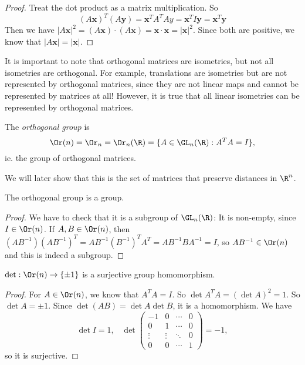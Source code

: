 \documentclass[a4paper]{article}
\begin{document}
\begin{proof}
  Treat the dot product as a matrix multiplication. So
  \[
    (A\mathbf{x})^T(A\mathbf{y}) = \mathbf{x}^{T}A^TAy = \mathbf{x}^TI\mathbf{y} = \mathbf{x}^T\mathbf{y}
  \]
  Then we have $|A\mathbf{x}|^2 = (A\mathbf{x})\cdot (A\mathbf{x}) = \mathbf{x}\cdot \mathbf{x} = |\mathbf{x}|^2$. Since both are positive, we know that $|A\mathbf{x}| = |\mathbf{x}|$.
\end{proof}
It is important to note that orthogonal matrices are isometries, but not all isometries are orthogonal. For example, translations are isometries but are not represented by orthogonal matrices, since they are not linear maps and cannot be represented by matrices at all! However, it is true that all linear isometries can be represented by orthogonal matrices.

\begin{defi}
  The \emph{orthogonal group} is
  \[
    \Or(n) = \Or_n = \Or_n(\R) = \{A\in \GL_n(\R): A^TA = I\},
  \]
  ie. the group of orthogonal matrices.
\end{defi}
We will later show that this is the set of matrices that preserve distances in $\R^n$.

\begin{lemma}
  The orthogonal group is a group.
\end{lemma}

\begin{proof}
  We have to check that it is a subgroup of $\GL_n(\R)$: It is non-empty, since $I\in \Or(n)$. If $A, B\in \Or(n)$, then $(AB^{-1})(AB^{-1})^T = AB^{-1}(B^{-1})^TA^{T} = AB^{-1}BA^{-1} = I$, so $AB^{-1}\in \Or(n)$ and this is indeed a subgroup.
\end{proof}


\begin{prop}
  $\det: \Or(n) \to \{\pm 1\}$ is a surjective group homomorphism.
\end{prop}

\begin{proof}
  For $A\in \Or(n)$, we know that $A^TA = I$. So $\det A^TA = (\det A)^2 = 1$. So $\det A = \pm 1$. Since $\det(AB) = \det A\det B$, it is a homomorphism. We have
  \[
    \det I = 1,\;\;\;\det
    \begin{pmatrix}
      -1 & 0 &\cdots & 0\\
      0 & 1 & \cdots & 0\\
      \vdots & \vdots & \ddots & 0\\
      0 & 0 & \cdots & 1
    \end{pmatrix} = -1,
  \]
  so it is surjective.
\end{proof}
\end{document}
